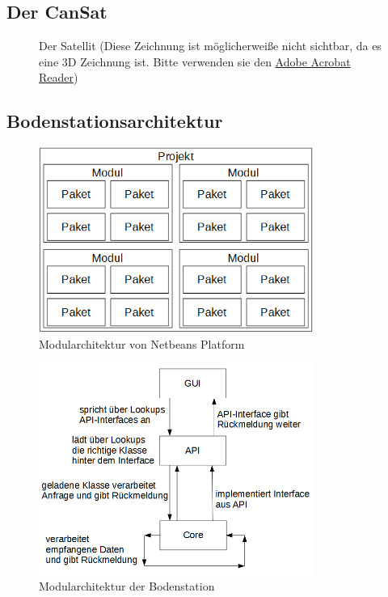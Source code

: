\newpage
\subsection{Der CanSat}
\begin{figure}[h] 
      \centering 
      \caption{Der Satellit (Diese Zeichnung ist möglicherweiße nicht sichtbar, da es eine 3D Zeichnung ist. Bitte verwenden sie den \href{https://get.adobe.com/reader/?loc=de}{Adobe Acrobat Reader})}\label{fig:hla} 
\end{figure} 

\newpage
\subsection{Bodenstationsarchitektur}
\begin{figure}[H]
	\centering
	\includegraphics[width=0.8\textwidth]{3_Beschreibung_der_Bodenstation/NBP_Modularchitektur.png}
	\caption{Modularchitektur von Netbeans Platform}
	\label{nbp_modularchitektur}
\end{figure}

\begin{figure}[H]
	\centering
	\includegraphics[width=0.8\textwidth]{3_Beschreibung_der_Bodenstation/Bodenstation_Modularchitektur.png}
	\caption{Modularchitektur der Bodenstation}
	\label{station_modularchitektur}
\end{figure}
\vspace{-5cm}
\newpage

